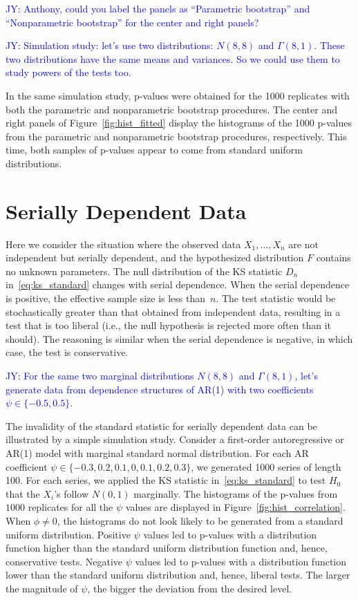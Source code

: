 \documentclass[12pt, letterpaper, titlepage]{article}
\newcommand{\jy}[1]{\textcolor{blue}{JY: #1}}
\begin{document}
\jy{Anthony, could you label the panels as ``Parametric bootstrap'' and
  ``Nonparametric bootstrap'' for the center and right panels?}

\jy{Simulation study: let's use two distributions:
  $N(8, 8)$ and $\Gamma(8, 1)$. These two distributions have the same means and
  variances. So we could use them to study powers of the tests too.}

In the same simulation study, p-values were obtained for the 1000 replicates
with both the parametric and nonparametric bootstrap procedures. The center and
right panels of Figure~\ref{fig:hist_fitted} display the histograms of the 1000
p-values from the parametric and nonparametric bootstrap procedures,
respectively. This time, both samples of p-values appear to come from
standard uniform distributions.

\section{Serially Dependent Data}
\label{sec:dependence}

Here we consider the situation where the observed data $X_1, \ldots, X_n$ are
not independent but serially dependent, and the hypothesized distribution $F$
contains no unknown parameters. The null distribution of the KS statistic $D_n$
in~\eqref{eq:ks_standard} changes with serial dependence.
When the serial dependence is
positive, the effective sample size is less than~$n$. The test statistic
would be stochastically greater than that obtained from independent data, 
resulting in a test that is too liberal (i.e., the null hypothesis is rejected
more often than it should). The reasoning is similar when the serial dependence 
is negative, in which case, the test is conservative.

\jy{For the same two marginal distributions $N(8, 8)$ and $\Gamma(8, 1)$, let's
  generate data from dependence structures of AR(1) with two coefficients
  $\psi \in \{ -0. 5, 0.5\}$.}

The invalidity of the standard statistic for serially dependent data can be
illustrated by a simple simulation study. Consider a first-order autoregressive
or AR(1) model with marginal standard normal distribution. For each AR
coefficient $\psi \in \{-0.3, 0.2, 0.1, 0, 0.1, 0.2, 0.3\}$, we generated 1000
series of length 100. For each series, we applied the KS statistic
in~\eqref{eq:ks_standard} to test $H_0$ that the $X_i$'s follow $N(0, 1)$
marginally. The histograms of the p-values from $1000$ replicates for all the
$\psi$ values are displayed in Figure~\ref{fig:hist_correlation}. When
$\phi \ne 0$, the histograms do not look likely to be generated from a standard
uniform distribution. Positive $\psi$ values led to p-values with a distribution
function higher than the standard uniform distribution function and, hence,
conservative tests. Negative $\psi$ values led to p-values with a distribution
function lower than the standard uniform distribution and, hence, liberal
tests. The larger the magnitude of
$\psi$, the bigger the deviation from the desired level.
\end{document}
